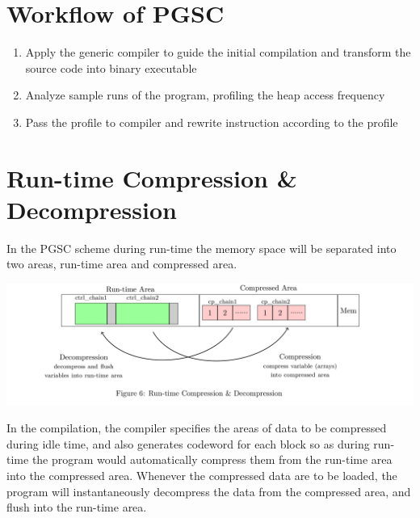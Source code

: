 \documentclass[a0,portrait]{a0poster}
\begin{document}
\begin{multicols}{2}
\section*{Workflow of PGSC}

\begin{enumerate}
	\item Apply the generic compiler to guide the initial compilation and transform the source code into binary executable
	\item Analyze sample runs of the program, profiling the heap access frequency
	\item Pass the profile to compiler and rewrite instruction according to the profile
\end{enumerate}

\section*{Run-time Compression \& Decompression}

In the PGSC scheme during run-time the memory space will be separated into two areas, run-time area and compressed area.
\vspace{1cm}

\includegraphics[width=\linewidth]{fig2}

\vspace{1cm}

In the compilation, the compiler specifies the areas of data to be compressed during idle time, and also generates codeword for each block so as during run-time the program would automatically compress them from the run-time area into the compressed area. Whenever the compressed data are to be loaded, the program will instantaneously decompress the data from the compressed area, and flush into the run-time area.  



\end{multicols}
\end{document}
